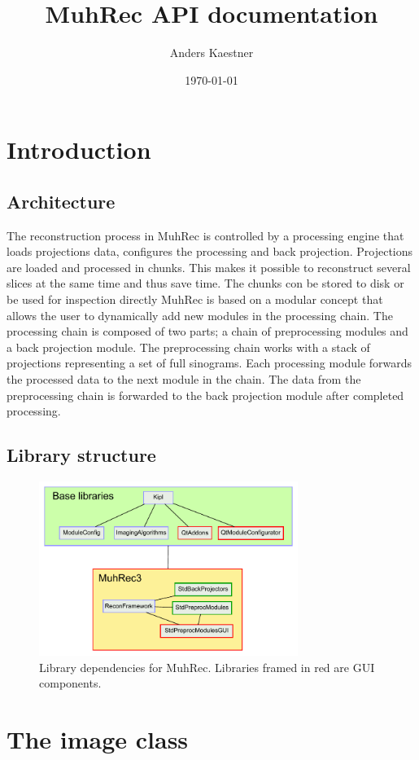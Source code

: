 \documentclass[11pt,a4paper]{article}
\author{Anders Kaestner}
\title{MuhRec API documentation}
\date{\today}
\begin{document}
\maketitle
\section{Introduction}
\subsection{Architecture}
The reconstruction process in MuhRec is controlled by a processing engine that loads projections data, configures the processing and back projection. Projections are loaded and processed in chunks. This makes it possible to reconstruct several slices at the same time and thus save time. The chunks con be stored to disk or be used for inspection directly 
MuhRec is based on a modular concept that allows the user to dynamically add new modules in the processing chain. The processing chain is composed of two parts; a chain of preprocessing modules and a back projection module. The preprocessing chain works with a stack of projections representing a set of full sinograms. Each processing module forwards the processed data to the next module in the chain. The data from the preprocessing chain is forwarded to the back projection module after completed processing. 


\subsection{Library structure}
\begin{figure}
\centering
\includegraphics[width=0.75\textwidth]{figures/KiplComponents.pdf}
\caption{Library dependencies for MuhRec. Libraries framed in red are GUI components.}
\end{figure}
\section{The image class}
\end{document}

